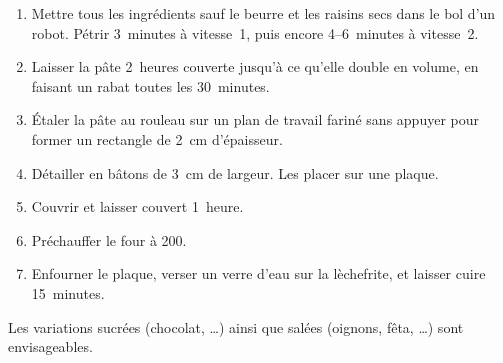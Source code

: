 
\begin{ingredients}
\end{ingredients}


\begin{recipe}
  \begin{enumerate}

  \item Mettre tous les ingrédients sauf le beurre et les raisins secs
    dans le bol d'un robot.  Pétrir 3~minutes à vitesse~1, puis encore
    4--6~minutes à vitesse~2.
    
  \item Laisser la pâte 2~heures couverte jusqu'à ce qu'elle double en
    volume, en faisant un rabat toutes les 30~minutes.
    
  \item Étaler la pâte au rouleau sur un plan de travail fariné sans
    appuyer pour former un rectangle de 2~cm d'épaisseur.
    
  \item Détailler en bâtons de 3~cm de largeur.  Les placer sur une
    plaque.
    
  \item Couvrir et laisser couvert 1~heure.
    
  \item Préchauffer le four à 200\degreeC.

  \item Enfourner le plaque, verser un verre d'eau sur la lèchefrite,
    et laisser cuire 15~minutes.
    
  \end{enumerate}
\end{recipe}

\notes Les variations sucrées (chocolat, \dots) ainsi que salées
(oignons, fêta, \dots) sont envisageables.

